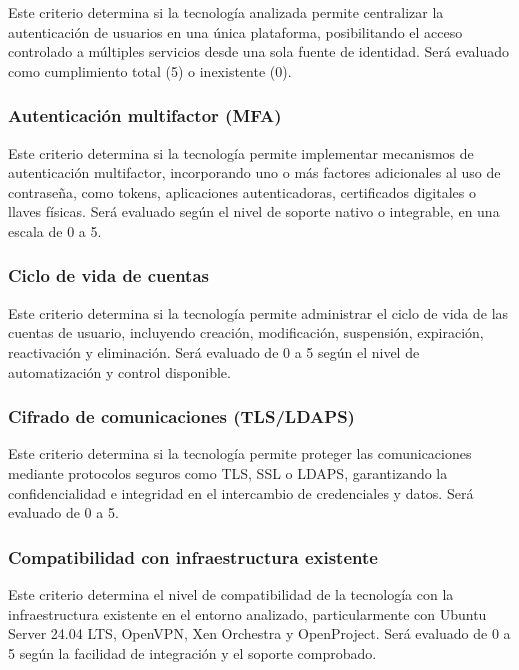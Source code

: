 Este criterio determina si la tecnología analizada permite centralizar la autenticación de usuarios en una única plataforma, posibilitando el acceso controlado a múltiples servicios desde una sola fuente de identidad. Será evaluado como cumplimiento total (5) o inexistente (0).

\subsubsection{Autenticación multifactor (\texorpdfstring{\acs{MFA}}{MFA})}

Este criterio determina si la tecnología permite implementar mecanismos de autenticación multifactor, incorporando uno o más factores adicionales al uso de contraseña, como tokens, aplicaciones autenticadoras, certificados digitales o llaves físicas. Será evaluado según el nivel de soporte nativo o integrable, en una escala de 0 a 5.

\subsubsection{Ciclo de vida de cuentas}

Este criterio determina si la tecnología permite administrar el ciclo de vida de las cuentas de usuario, incluyendo creación, modificación, suspensión, expiración, reactivación y eliminación. Será evaluado de 0 a 5 según el nivel de automatización y control disponible.

\subsubsection{Cifrado de comunicaciones (\texorpdfstring{\acs{TLS}/\acs{LDAPS}}{TLS/LDAPS})}

Este criterio determina si la tecnología permite proteger las comunicaciones mediante protocolos seguros como \ac{TLS}, \ac{SSL} o \ac{LDAPS}, garantizando la confidencialidad e integridad en el intercambio de credenciales y datos. Será evaluado de 0 a 5.

\subsubsection{Compatibilidad con infraestructura existente}

Este criterio determina el nivel de compatibilidad de la tecnología con la infraestructura existente en el entorno analizado, particularmente con Ubuntu Server 24.04 \acs{LTS}, OpenVPN, Xen Orchestra y OpenProject. Será evaluado de 0 a 5 según la facilidad de integración y el soporte comprobado.

